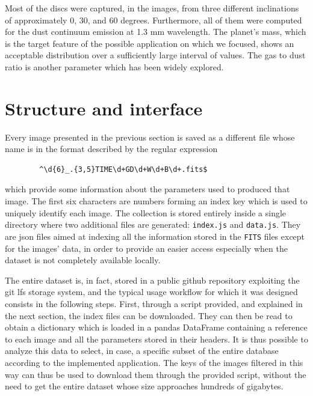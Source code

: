 \documentclass[a4paper,10pt]{report}
\begin{document}
Most of the discs were captured, in the images, from three different inclinations of approximately
0, 30, and 60 degrees. Furthermore, all of them were computed for the dust continuum emission 
at 1.3 mm wavelength.
The planet's mass, which is the target feature of the possible application on which we focused, shows an acceptable distribution over
a sufficiently large interval of values. The gas to dust ratio is another parameter which has been widely explored.

\section{Structure and interface}

Every image presented in the previous section is saved as a different file whose name is in the format 
described by the regular expression 
\begin{center}
    \begin{lstlisting}
        ^\d{6}_.{3,5}TIME\d+GD\d+W\d+B\d+.fits$
    \end{lstlisting}
\end{center}
which provide some information about the parameters used to produced that image. The first six 
characters are numbers forming an index key which is used to uniquely identify each image.
The collection is stored entirely inside a single directory where two additional files are generated: 
\lstinline{index.js} and \lstinline{data.js}. They are json files aimed at indexing all the information stored in the \lstinline{FITS} 
files except for the images' data, in order to provide an easier access especially when the dataset is not completely
available locally.

The entire dataset is, in fact, stored in a public github repository exploiting
the git lfs storage system, and the typical usage workflow for which it was designed 
consists in the following steps. First, through a script provided, and explained in the next section,
the index files can be downloaded. They can then be read to obtain a dictionary which is loaded in a pandas DataFrame containing
a reference to each image and all the parameters stored in their headers. 
It is thus possible to analyze this data to select, in case, a specific subset of the entire database
according to the implemented application.
The keys of the images filtered in this way can thus be used to download them through the provided script, without the need
to get the entire dataset whose size approaches hundreds of gigabytes.
\end{document}
